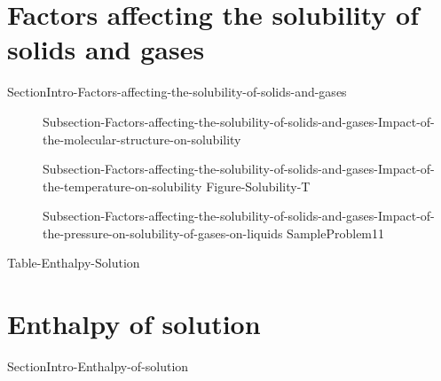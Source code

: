\documentclass[main.tex]{subfiles}
\begin{document}
\section{Factors affecting the solubility of solids and gases}{SectionIntro-Factors-affecting-the-solubility-of-solids-and-gases}
\sloppy \begin{description}
\item[] {Subsection-Factors-affecting-the-solubility-of-solids-and-gases-Impact-of-the-molecular-structure-on-solubility}
\vspace{0cm}\hspace{-1cm}{Figure-Vapor-pressure-liquids}
\item[] {Subsection-Factors-affecting-the-solubility-of-solids-and-gases-Impact-of-the-temperature-on-solubility}
{Figure-Solubility-T}
\item[] {Subsection-Factors-affecting-the-solubility-of-solids-and-gases-Impact-of-the-pressure-on-solubility-of-gases-on-liquids}
{SampleProblem11}
\end{description}






{Table-Enthalpy-Solution}







\section{Enthalpy of solution}{SectionIntro-Enthalpy-of-solution}
\newpage \hspace{-35cm}{Figure-Enthalpy-of-mixing-diagram }
\end{document}
